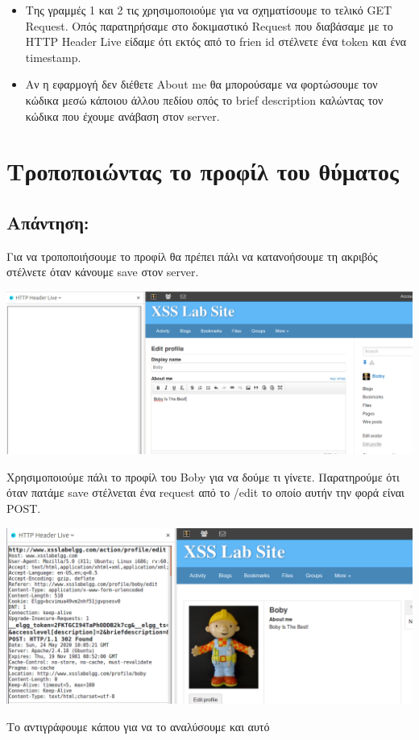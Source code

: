 \begin{itemize}
	\item Της γραμμές 1 και 2 τις χρησιμοποιούμε για να σχηματίσουμε το 
	τελικό GET Request. Οπός παρατηρήσαμε στο δοκιμαστικό Request που
	διαβάσαμε με το HTTP Header Live είδαμε ότι εκτός από το frien id
	στέλνετε ένα token και ένα timestamp.
	\item Αν η εφαρμογή δεν διέθετε About me θα μπορούσαμε να φορτώσουμε
	τον κώδικα μεσώ κάποιου άλλου πεδίου οπός το brief description καλώντας
	τον κώδικα που έχουμε ανάβαση στον server.
\end{itemize}

\section{Τροποποιώντας το προφίλ του θύματος}
\subsection*{Απάντηση:}
\noindent
Για να τροποποιήσουμε το προφίλ θα πρέπει πάλι να κατανοήσουμε τη ακριβός
στέλνετε όταν κάνουμε save στον server. 

\begin{center}
			\includegraphics[width=1\textwidth]{image/5.0.1.PNG}		
\end{center}
\noindent
Χρησιμοποιούμε πάλι το προφίλ του
Boby για να δούμε τι γίνετε. Παρατηρούμε ότι όταν πατάμε save 
στέλνεται ένα request από το /edit το οποίο αυτήν την φορά είναι POST.

\begin{center}
			\includegraphics[width=1\textwidth]{image/5.0.2.PNG}		
\end{center}
\noindent
Το αντιγράφουμε κάπου για να το αναλύσουμε και αυτό


